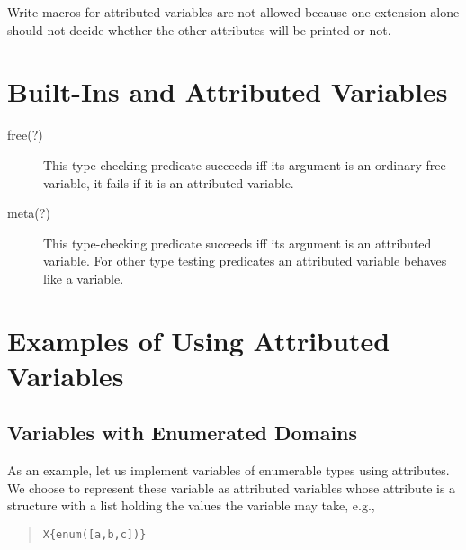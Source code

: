 Write macros for attributed variables are not allowed because one extension
alone
should not decide whether the other attributes will be printed or not.

\section{Built-Ins and Attributed Variables}
\begin{description}
\item[free(?)]
This type-checking predicate succeeds iff its argument is an
ordinary free variable, it fails if it is an attributed variable.

\item[meta(?)]
This type-checking predicate succeeds iff its argument is an attributed
variable.
For other type testing predicates an attributed variable behaves like a
variable.
\end{description}

\section{Examples of Using Attributed Variables}
\subsection{Variables with Enumerated Domains}
As an example, let us implement variables of enumerable types
using attributes.
We choose to represent these variable as attributed variables
whose attribute is
a  structure with a list holding the values the variable may
take, e.g.,
\begin{quote}
\begin{verbatim}
X{enum([a,b,c])}
\end{verbatim}
\end{quote}

